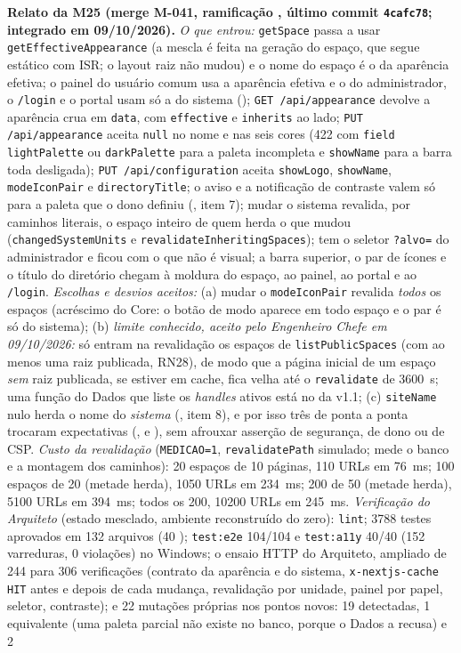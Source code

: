 \noindent{}\quad \textbf{Relato da M25 (merge M-041, ramificação , último commit \texttt{4cafc78}; integrado em 09/10/2026).} \emph{O que entrou:} \texttt{getSpace} passa a usar \texttt{getEffectiveAppearance} (a mescla é feita na geração do espaço, que segue estático com ISR; o layout raiz não mudou) e o nome do espaço é o da aparência efetiva; o painel do usuário comum usa a aparência efetiva e o do administrador, o \texttt{/login} e o portal usam só a do sistema (); \texttt{GET /api/appearance} devolve a aparência crua em \texttt{data}, com \texttt{effective} e \texttt{inherits} ao lado; \texttt{PUT /api/appearance} aceita \texttt{null} no nome e nas seis cores (422 com \texttt{field} \texttt{lightPalette} ou \texttt{darkPalette} para a paleta incompleta e \texttt{showName} para a barra toda desligada); \texttt{PUT /api/configuration} aceita \texttt{showLogo}, \texttt{showName}, \texttt{modeIconPair} e \texttt{directoryTitle}; o aviso e a notificação de contraste valem só para a paleta que o dono definiu (, item 7); mudar o sistema revalida, por caminhos literais, o espaço inteiro de quem herda o que mudou (\texttt{changedSystemUnits} e \texttt{revalidateInheritingSpaces});  tem o seletor \texttt{?alvo=} do administrador e  ficou com o que não é visual; a barra superior, o par de ícones e o título do diretório chegam à moldura do espaço, ao painel, ao portal e ao \texttt{/login}. \emph{Escolhas e desvios aceitos:} (a) mudar o \texttt{modeIconPair} revalida \emph{todos} os espaços (acréscimo do Core: o botão de modo aparece em todo espaço e o par é só do sistema); (b) \emph{limite conhecido, aceito pelo Engenheiro Chefe em 09/10/2026:} só entram na revalidação os espaços de \texttt{listPublicSpaces} (com ao menos uma raiz publicada, RN28), de modo que a página inicial de um espaço \emph{sem} raiz publicada, se estiver em cache, fica velha até o \texttt{revalidate} de 3600~s; uma função do Dados que liste os \emph{handles} ativos está no  da v1.1; (c) \texttt{siteName} nulo herda o nome do \emph{sistema} (, item 8), e por isso três  de ponta a ponta trocaram expectativas (,  e ), sem afrouxar asserção de segurança, de dono ou de CSP. \emph{Custo da revalidação} (\texttt{MEDICAO=1}, \texttt{revalidatePath} simulado; mede o banco e a montagem dos caminhos): 20 espaços de 10 páginas, 110 URLs em 76~ms; 100 espaços de 20 (metade herda), 1050 URLs em 234~ms; 200 de 50 (metade herda), 5100 URLs em 394~ms; todos os 200, 10200 URLs em 245~ms. \emph{Verificação do Arquiteto} (estado mesclado, ambiente reconstruído do zero): \texttt{lint}; 3788 testes aprovados em 132 arquivos (40 ); \texttt{test:e2e} 104/104 e \texttt{test:a11y} 40/40 (152 varreduras, 0 violações) no Windows; o ensaio HTTP do Arquiteto, ampliado de 244 para 306 verificações (contrato da aparência e do sistema, \texttt{x-nextjs-cache} \texttt{HIT} antes e depois de cada mudança, revalidação por unidade, painel por papel, seletor, contraste); e 22 mutações próprias nos pontos novos: 19 detectadas, 1 equivalente (uma paleta parcial não existe no banco, porque o Dados a recusa) e 2 